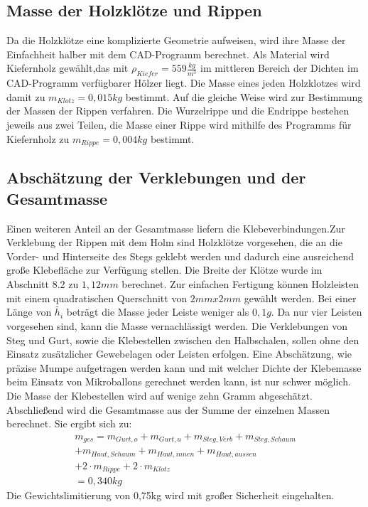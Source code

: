 \subsection{Masse der Holzklötze und Rippen}
Da die Holzklötze eine komplizierte Geometrie aufweisen, wird ihre Masse der Einfachheit halber mit dem CAD-Programm berechnet. Als Material wird Kiefernholz gewählt,das mit $ \rho_{Kiefer}=559\frac{kg}{m^{3}} $ im mittleren Bereich der Dichten im CAD-Programm verfügbarer Hölzer liegt. Die Masse eines jeden Holzklotzes wird damit zu $ m_{Klotz}=0,015kg $ bestimmt.
Auf die gleiche Weise wird zur Bestimmung der Massen der Rippen verfahren. Die Wurzelrippe und die Endrippe bestehen jeweils aus zwei Teilen, die Masse einer Rippe wird mithilfe des Programms für Kiefernholz zu $ m_{Rippe}=0,004kg $ bestimmt.

\subsection{Abschätzung der Verklebungen und der Gesamtmasse}
Einen weiteren Anteil an der Gesamtmasse liefern die Klebeverbindungen.Zur Verklebung der Rippen mit dem Holm sind Holzklötze vorgesehen, die an die Vorder- und Hinterseite des Stegs geklebt werden und dadurch eine ausreichend große Klebefläche zur Verfügung stellen. Die Breite der Klötze wurde im Abschnitt 8.2 zu $ 1,12mm $ berechnet. Zur einfachen Fertigung können Holzleisten mit einem quadratischen Querschnitt von $ 2mm x 2mm $ gewählt werden. Bei einer Länge von $ \tilde{h_{i}} $ beträgt die Masse jeder Leiste weniger als $ 0,1g $. Da nur vier Leisten vorgesehen sind, kann die Masse vernachlässigt werden. Die Verklebungen von Steg und Gurt, sowie die Klebestellen zwischen den Halbschalen, sollen ohne den Einsatz zusätzlicher Gewebelagen oder Leisten erfolgen. Eine Abschätzung, wie präzise Mumpe aufgetragen werden kann und mit welcher Dichte der Klebemasse beim Einsatz von Mikroballons gerechnet werden kann, ist nur schwer möglich. Die Masse der Klebestellen wird auf wenige zehn Gramm abgeschätzt.\\

\noindent Abschließend wird die Gesamtmasse aus der Summe der einzelnen Massen berechnet. Sie ergibt sich zu:
\begin{equation}
\begin{array}{l}
	m_{ges}= m_{Gurt,o}+m_{Gurt,u}+m_{Steg,Verb}+m_{Steg,Schaum} \\ +m_{Haut,Schaum}+m_{Haut,innen}+m_{Haut,aussen} \\ +2\cdot m_{Rippe}+2\cdot m_{Klotz} \\=0,340kg
\end{array}  
\end{equation}
Die Gewichtslimitierung von 0,75kg wird mit großer Sicherheit eingehalten.

